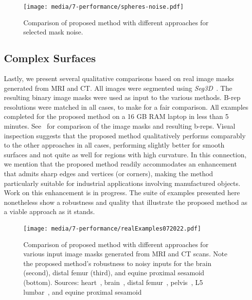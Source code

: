 \begin{figure}[]
	\centering
	\texttt{[image: media/7-performance/spheres-noise.pdf]}
	\caption{{Comparison of proposed method with different approaches for selected mask noise.}}
	\label{fig:demos4}
\end{figure}

\subsection{{Complex Surfaces}}
\label{Complex Surfaces}

Lastly, we present several qualitative comparisons based on real image masks generated from MRI and CT.  All images were segmented using \textit{Seg3D}~\cite{Seg3D}. The resulting binary image masks were used as input to the various methods. B-rep resolutions were matched in all cases, to make for a fair comparison. All examples completed for the proposed method on a 16 GB RAM laptop in less than 5 minutes. See~ for comparison of the image masks and resulting b-reps. Visual inspection suggests that the proposed method qualitatively performs comparably to the {other approaches} in all cases, performing slightly better for smooth surfaces and not quite as well for regions with high curvature. In this connection, we mention that the proposed method readily accommodates an enhancement that admits sharp edges and vertices (or corners), making the method particularly suitable for industrial applications involving manufactured objects.  Work on this enhancement is in progress.  The suite of examples presented here nonetheless show a robustness and quality that illustrate the proposed method as a viable approach as it stands. \\
%
\begin{figure}[h!]
	\centering
	 \texttt{[image: media/7-performance/realExamples072022.pdf]}
	\caption{{Comparison of proposed method with different approaches for various input image masks generated from MRI and CT scans. Note the proposed method's robustness to noisy inputs for the brain (second), distal femur (third), and equine proximal sesamoid (bottom). Sources: heart~\cite{cvgg}, brain~\cite{marcus_2007}, distal femur~\cite{epperson_2013}, pelvis~\cite{clark_2013}, L5 lumbar~\cite{yao_2016}, and equine proximal sesamoid~\cite{shaffer2021}}}
	\label{fig:example-meshes}
\end{figure} \\
